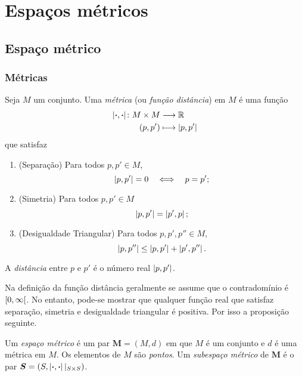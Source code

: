 \chapter{Espaços métricos}

\section{Espaço métrico}

\subsection{Métricas}

\begin{definition}
Seja $M$ um conjunto. Uma \emph{métrica} (ou \emph{função distância}) em $M$ é uma função
	\begin{align*}
	{\left\vert{\bm{\cdot}},{\bm{\cdot}}\right\vert}\colon {M \times M} &\longrightarrow {\mathbb{R}} \\{(p,p')} &\longmapsto \left\vert{p},{p'}\right\vert
	\end{align*}
que satisfaz
	\begin{enumerate}
	\item (Separação) Para todos $p,p' \in M$,
		\begin{equation*}
		\left\vert{p},{p'}\right\vert = 0 \quad \Longleftrightarrow \quad p = p';
		\end{equation*}
	\item (Simetria) Para todos $p,p' \in M$
		\begin{equation*}
		\left\vert{p},{p'}\right\vert = \left\vert{p'},{p}\right\vert;
		\end{equation*}
	\item (Desigualdade Triangular) Para todos $p,p',p'' \in M$,
		\begin{equation*}
		\left\vert{p},{p''}\right\vert \leq \left\vert{p},{p'}\right\vert + \left\vert{p'},{p''}\right\vert.
		\end{equation*}
	\end{enumerate}
A \emph{distância} entre $p$ e $p'$ é o número real $\left\vert{p},{p'}\right\vert$.
\end{definition}

Na definição da função distância geralmente se assume que o contradomínio é $\left[{0},{\infty}\right[$. No entanto, pode-se mostrar que qualquer função real que satisfaz separação, simetria e desigualdade triangular é positiva. Por isso a proposição seguinte.

\begin{definition}
Um \emph{espaço métrico} é um par $\bm M = (M,d)$ em que $M$ é um conjunto e $d$ é uma métrica em $M$. Os elementos de $M$ são \emph{pontos}. Um \emph{subespaço métrico} de $\bm M$ é o par $\bm S=(S,\left\vert{\bm{\cdot}},{\bm{\cdot}}\right\vert|_{S \times S})$.
\end{definition}

